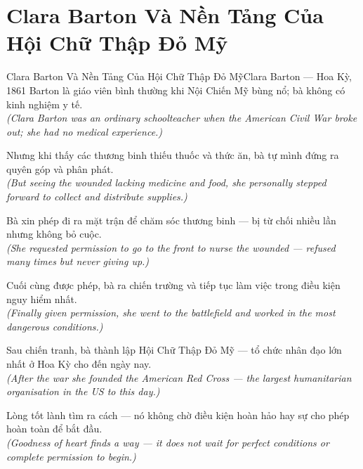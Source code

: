 \section{Clara Barton Và Nền Tảng Của Hội Chữ Thập Đỏ Mỹ}
\begin{truyen}{Clara Barton Và Nền Tảng Của Hội Chữ Thập Đỏ Mỹ}{Clara Barton --- Hoa Kỳ, 1861}
 Barton là giáo viên bình thường khi Nội Chiến Mỹ bùng nổ; bà không có kinh nghiệm y tế.\\[4pt]
\textit{(Clara Barton was an ordinary schoolteacher when the American Civil War broke out; she had no medical experience.)}

Nhưng khi thấy các thương binh thiếu thuốc và thức ăn, bà tự mình đứng ra quyên góp và phân phát.\\[4pt]
\textit{(But seeing the wounded lacking medicine and food, she personally stepped forward to collect and distribute supplies.)}

Bà xin phép đi ra mặt trận để chăm sóc thương binh --- bị từ chối nhiều lần nhưng không bỏ cuộc.\\[4pt]
\textit{(She requested permission to go to the front to nurse the wounded --- refused many times but never giving up.)}

Cuối cùng được phép, bà ra chiến trường và tiếp tục làm việc trong điều kiện nguy hiểm nhất.\\[4pt]
\textit{(Finally given permission, she went to the battlefield and worked in the most dangerous conditions.)}

Sau chiến tranh, bà thành lập Hội Chữ Thập Đỏ Mỹ --- tổ chức nhân đạo lớn nhất ở Hoa Kỳ cho đến ngày nay.\\[4pt]
\textit{(After the war she founded the American Red Cross --- the largest humanitarian organisation in the US to this day.)}

\end{truyen}
\begin{baihoc}
  Lòng tốt lành tìm ra cách --- nó không chờ điều kiện hoàn hảo hay sự cho phép hoàn toàn để bắt đầu.\\[4pt]
  \textit{(Goodness of heart finds a way --- it does not wait for perfect conditions or complete permission to begin.)}
\end{baihoc}

